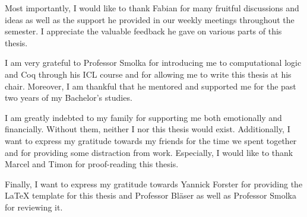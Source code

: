 Most importantly, I would like to thank Fabian for many fruitful discussions and ideas as well as the support he provided in our weekly meetings throughout the semester. I appreciate the valuable feedback he gave on various parts of this thesis. 

I am very grateful to Professor Smolka for introducing me to computational logic and Coq through his ICL course and for allowing me to write this thesis at his chair. Moreover, I am thankful that he mentored and supported me for the past two years of my Bachelor's studies. 

I am greatly indebted to my family for supporting me both emotionally and financially. Without them, neither I nor this thesis would exist. 
Additionally, I want to express my gratitude towards my friends for the time we spent together and for providing some distraction from work. Especially, I would like to thank Marcel and Timon for proof-reading this thesis. 

Finally, I want to express my gratitude towards Yannick Forster for providing the \LaTeX{} template for this thesis and Professor Bläser as well as Professor Smolka for reviewing it.
